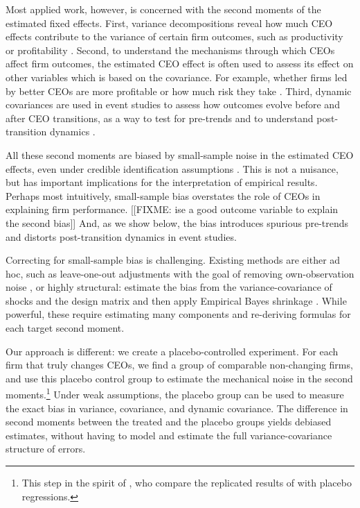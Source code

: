 \documentclass[11pt,a4paper]{article}
\begin{document}
Most applied work, however, is concerned with the second moments of the estimated fixed effects. First, variance decompositions reveal how much CEO effects contribute to the variance of certain firm outcomes, such as productivity or profitability \citep{}. Second, to understand the mechanisms through which CEOs affect firm outcomes, the estimated CEO effect is often used to assess its effect on other variables which is based on the covariance. For example, whether firms led by better CEOs are more profitable \citep{mackey2008effect} or how much risk they take \cite{schoar2024effect}. Third, dynamic covariances are used in event studies to assess how outcomes evolve before and after CEO transitions, as a way to test for pre-trends and to understand post-transition dynamics \citep{schoar2024effect}.

All these second moments are biased by small-sample noise in the estimated CEO effects, even under credible identification assumptions \citep{andrews2008high,gaure2014correlation,Bonhomme2023-dx}. This is not a nuisance, but has important implications for the interpretation of empirical results. Perhaps most intuitively, small-sample bias overstates the role of CEOs in explaining firm performance. [[FIXME: ise a good outcome variable to explain the second bias]] And, as we show below, the bias introduces spurious pre-trends and distorts post-transition dynamics in event studies.

Correcting for small-sample bias is challenging. Existing methods are either ad hoc, such as leave-one-out adjustments with the goal of removing own-observation noise \citep{}, or highly structural: estimate the bias from the variance-covariance of shocks and the design matrix and then apply Empirical Bayes shrinkage \citep{andrews2008high,Bonhomme2023-dx,kline2024firm}. While powerful, these require estimating many components and re-deriving formulas for each target second moment.

Our approach is different: we create a placebo-controlled experiment. For each firm that truly changes CEOs, we find a group of comparable non-changing firms, and use this placebo control group to estimate the mechanical noise in the second moments.\footnote{This step in the spirit of \cite{jarosiewicz2023revisiting}, who compare the replicated results of \cite{Bertrand2003-io} with placebo regressions.} Under weak assumptions, the placebo group can be used to measure the exact bias in variance, covariance, and dynamic covariance. The difference in second moments between the treated and the placebo groups yields debiased estimates, without having to model and estimate the full variance-covariance structure of errors.
\end{document}

